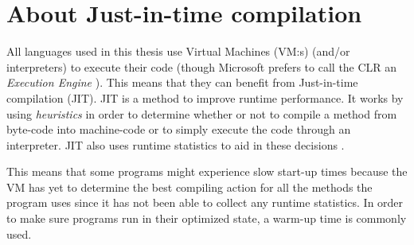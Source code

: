 \section{About Just-in-time compilation}
All languages used in this thesis use Virtual Machines (VM:s) (and/or interpreters) to execute their code (though Microsoft prefers to call the CLR an \textit{Execution Engine} \cite{ExecutionEngine}). This means that they can benefit from Just-in-time compilation (JIT). JIT is a method to improve runtime performance. It works by using \textit{heuristics} in order to determine whether or not to compile a method from byte-code into machine-code or to simply execute the code through an interpreter. JIT also uses runtime statistics to aid in these decisions \cite{Jit}.

This means that some programs might experience slow start-up times because the VM has yet to determine the best compiling action for all the methods the program uses since it has not been able to collect any runtime statistics. In order to make sure programs run in their optimized state, a warm-up time is commonly used.
